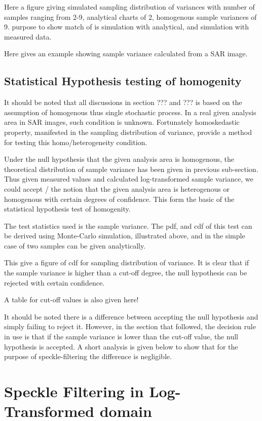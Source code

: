 \documentclass[journal]{IEEEtran}
\begin{document}
Here a figure giving simulated sampling distribution of variances with number of samples ranging from 2-9, analytical charts of 2, homogenous sample variances of 9. purpose to show match of is simulation with analytical, and simulation with measured data.

Here gives an example showing sample variance calculated from a SAR image.

\subsection{Statistical Hypothesis testing of homogenity}

It should be noted that all discussions in section ??? and ??? is based on the assumption of homogenous thus single stochastic process. In a real given analysis area in SAR images, such condition is unknown. Fortunately homoskedastic property, manifested in the sampling distribution of variance, provide a method for testing this homo/heterogeneity condition.

Under the null hypothesis that the given analysis area is homogenous, the theoretical distribution of sample variance has been given in previous sub-section. Thus given measured values and calculated log-transformed sample variance, we could accept / the notion that the given analysis area is heterogenous or homogenous with certain degrees of confidence. This form the basic of the statistical hypothesis test of homogenity.

The test statistics used is the sample variance. The pdf, and cdf of this test can be derived using Monte-Carlo simulation, illustrated above, and in the simple case of two samples can be given analytically. 

This give a figure of cdf for sampling distribution of variance. It is clear that if the sample variance is higher than a cut-off degree, the null hypothesis can be rejected with certain confidence.  

A table for cut-off values is also given here!

It should be noted there is a difference between accepting the null hypothesis and simply failing to reject it. However, in the section that followed, the decision rule in use is that if the sample variance is lower than the cut-off value, the null hypothesis is accepted. A  short analysis is given below to show that for the purpose of speckle-filtering the difference is negligible.

\section{Speckle Filtering in Log-Transformed domain}
\end{document}
